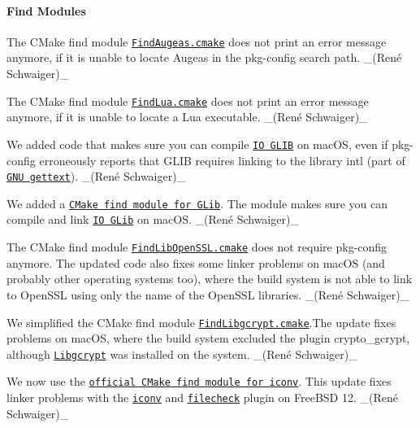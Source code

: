 \paragraph*{Find Modules}


\begin{DoxyItemize}
\item The C\+Make find module \href{https://master.libelektra.org/cmake/Modules/FindAugeas.cmake}{\tt {\ttfamily Find\+Augeas.\+cmake}} does not print an error message anymore, if it is unable to locate Augeas in the {\ttfamily pkg-\/config} search path. \+\_\+(René Schwaiger)\+\_\+
\item The C\+Make find module \href{https://master.libelektra.org/cmake/Modules/FindLua.cmake}{\tt {\ttfamily Find\+Lua.\+cmake}} does not print an error message anymore, if it is unable to locate a Lua executable. \+\_\+(René Schwaiger)\+\_\+
\item We added code that makes sure you can compile \href{https://www.libelektra.org/bindings/io_glib}{\tt IO G\+L\+IB} on mac\+OS, even if {\ttfamily pkg-\/config} erroneously reports that G\+L\+IB requires linking to the library {\ttfamily intl} (part of \href{https://www.gnu.org/software/gettext}{\tt G\+NU gettext}). \+\_\+(René Schwaiger)\+\_\+
\item We added a \href{https://master.libelektra.org/cmake/Modules/FindGLib.cmake}{\tt C\+Make find module for G\+Lib}. The module makes sure you can compile and link \href{https://www.libelektra.org/bindings/io_glib}{\tt IO G\+Lib} on mac\+OS. \+\_\+(René Schwaiger)\+\_\+
\item The C\+Make find module \href{https://master.libelektra.org/cmake/Modules/FindLibOpenSSL.cmake}{\tt {\ttfamily Find\+Lib\+Open\+S\+S\+L.\+cmake}} does not require {\ttfamily pkg-\/config} anymore. The updated code also fixes some linker problems on mac\+OS (and probably other operating systems too), where the build system is not able to link to Open\+S\+SL using only the name of the Open\+S\+SL libraries. \+\_\+(René Schwaiger)\+\_\+
\item We simplified the C\+Make find module \href{https://master.libelektra.org/cmake/Modules/FindLibgcrypt.cmake}{\tt {\ttfamily Find\+Libgcrypt.\+cmake}}.The update fixes problems on mac\+OS, where the build system excluded the plugin {\ttfamily crypto\+\_\+gcrypt}, although \href{https://gnupg.org/software/libgcrypt}{\tt Libgcrypt} was installed on the system. \+\_\+(René Schwaiger)\+\_\+
\item We now use the \href{https://github.com/Kitware/CMake/blob/master/Modules/FindIconv.cmake}{\tt official C\+Make find module for {\ttfamily iconv}}. This update fixes linker problems with the \href{http://libelektra.org/plugins/iconv}{\tt {\ttfamily iconv}} and \href{http://libelektra.org/plugins/filecheck}{\tt {\ttfamily filecheck}} plugin on Free\+B\+SD 12. \+\_\+(René Schwaiger)\+\_\+

\end{DoxyItemize}
